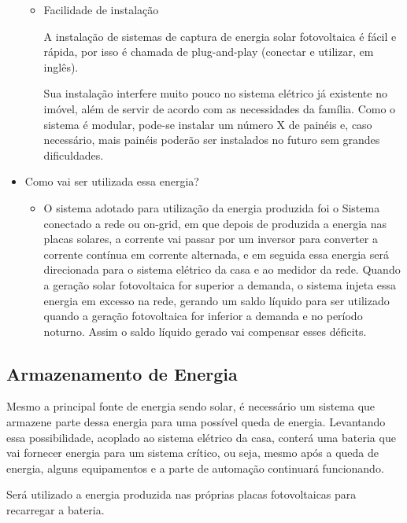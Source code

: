 \begin{itemize}
\begin{itemize}
                            \item Facilidade de instalação
                                \par A instalação de sistemas de captura de energia solar fotovoltaica é fácil e rápida, por isso é chamada de plug-and-play (conectar e utilizar, em inglês).
                                \par Sua instalação interfere muito pouco no sistema elétrico já existente no imóvel, além de servir de acordo com as necessidades da família. Como o sistema é modular, pode-se instalar um número X de painéis e, caso necessário, mais painéis poderão ser instalados no futuro sem grandes dificuldades.
        	            \end{itemize}
        	       \item Como vai ser utilizada essa energia?
	                    \begin{itemize}
	                        \item O sistema adotado para utilização da energia produzida foi o Sistema conectado a rede ou on-grid, em que depois de produzida a energia nas placas solares, a corrente vai passar por um inversor para converter a corrente contínua em corrente alternada, e em seguida essa energia será direcionada para o sistema elétrico da casa e ao medidor da rede. Quando a geração solar fotovoltaica for superior a demanda, o sistema injeta essa energia em excesso na rede, gerando um saldo líquido para ser utilizado quando a geração fotovoltaica for inferior a demanda e no período noturno. Assim o saldo líquido gerado vai compensar esses déficits.
	                    \end{itemize}
        	        \end{itemize}
        	 \subsection{Armazenamento de Energia}
        	    \par Mesmo a principal fonte de energia sendo solar, é necessário um sistema que armazene parte dessa energia para uma possível queda de energia. Levantando essa possibilidade, acoplado ao sistema elétrico da casa, conterá uma bateria que vai fornecer energia para um sistema crítico, ou seja, mesmo após a queda de energia, alguns equipamentos e a parte de automação continuará funcionando.
                \par Será utilizado a energia produzida nas próprias placas fotovoltaicas para recarregar a bateria.

